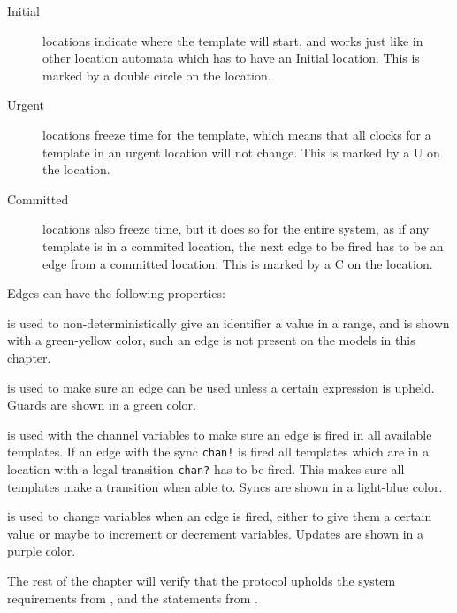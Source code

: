 \begin{description}
	\item [Initial] locations indicate where the template will start, and works just like in other location automata which has to have an Initial location. This is marked by a double circle on the location.
	\item [Urgent] locations freeze time for the template, which means that all clocks for a template in an urgent location will not change. This is marked by a U on the location.
	\item [Committed] locations also freeze time, but it does so for the entire system, as if any template is in a commited location, the next edge to be fired has to be an edge from a committed location. This is marked by a C on the location.
\end{description}

\noindent

Edges can have the following properties:

\begin{description}[labelindent=\parindent,labelsep=1ex]
    \item[Select] is used to non-deterministically give an identifier a value in a range, and is shown with a green-yellow color, such an edge is not present on the models in this chapter.
    \item[Guard] is used to make sure an edge can be used unless a certain expression is upheld. Guards are shown in a green color.
    \item[Sync] is used with the channel variables to make sure an edge is fired in all available templates. If an edge with the sync \texttt{chan!} is fired all templates which are in a location with a legal transition \texttt{chan?} has to be fired. This makes sure all templates make a transition when able to. Syncs are shown in a light-blue color.
    \item[Update] is used to change variables when an edge is fired, either to give them a certain value or maybe to increment or decrement variables. Updates are shown in a purple color.
\end{description}

\noindent
The rest of the chapter will verify that the protocol upholds the system requirements from , and the statements from .
